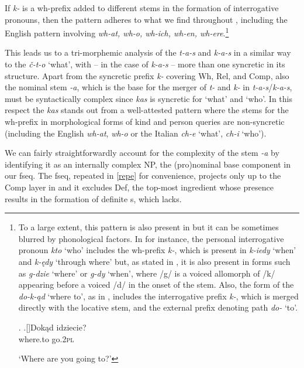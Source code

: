 If \textit{k-} is a wh-prefix added to different stems in the formation of interrogative pronouns, then the  pattern adheres to what we find throughout , including the English pattern involving \textit{wh-at, wh-o, wh-ich, wh-en, wh-ere}.\footnote{To a large extent, this pattern is also present in  but it can be sometimes blurred by phonological factors. In  for instance, the personal interrogative pronoun \textit{kto} `who' includes the wh-prefix \textit{k-}, which is present in \textit{k-iedy} `when' and \textit{k-\k{e}dy }`through where' but, as stated in \cite{Wiland-PSiCL}, it is also present in forms such as \textit{g-dzie} `where' or \textit{g-dy} `when', where /g/ is a voiced allomorph  of /k/ appearing before a voiced /d/ in the onset of the stem. Also, the form of the  \textit{do-k-\k{a}d} `where to', as in \Next, includes the interrogative prefix \textit{k-}, which is merged directly with the locative stem, and the external prefix denoting path \textit{do-} `to'.

\noindent\parbox{\linguexfootnotewidth}{\ex. 
\ag.[]\hspace{-22pt}Dok\k{a}d idziecie?\\
\hspace{-22pt}where.to go.\textsc{2pl}\\
\hspace{-22pt}\strut `Where are you going to?'


}} %
\par
This leads us to a tri-mor\-phe\-mic analysis of the  \textit{t-a-s} and \textit{k-a-s} in a similar way to the  \textit{\v{c}-t-o} `what', with -- in the case of \textit{k-a-s} -- more than one syncretic  in its structure. Apart from the syncretic prefix \textit{k-} covering Wh, Rel, and Comp, also the nominal stem \textit{-a}, which is the base for the merger of \textit{t-} and \textit{k-} in \textit{t-a-s}/\textit{k-a-s}, must be syntactically complex since \textit{kas} is syncretic for `what' and `who'. In this respect the  \textit{kas} stands out from a well-attested pattern where the stems for the wh-prefix in morphological forms of kind and person queries are non-syncretic (including the English \textit{wh-at}, \textit{wh-o} or the Italian \textit{ch-e} `what', \textit{ch-i} `who'). 
\par
We can fairly straightforwardly account for the complexity of the  stem \textit{-a} by identifying it as an internally complex NP, the (pro)nominal base component in our fseq. The  fseq, repeated in \ref{repe} for convenience, projects only up to the Comp layer in  and it excludes Def, the top-most ingredient whose presence results in the formation of definite s, which  lacks.

